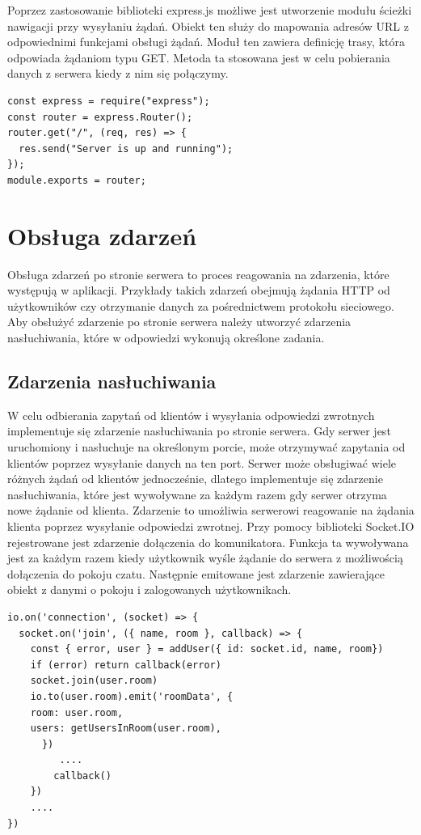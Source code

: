 Poprzez zastosowanie biblioteki express.js możliwe jest utworzenie modułu ścieżki nawigacji przy wysyłaniu żądań. Obiekt ten służy do mapowania adresów URL z odpowiednimi funkcjami obsługi żądań. Moduł ten zawiera definicję trasy, która odpowiada żądaniom typu GET. Metoda ta stosowana jest w celu pobierania danych z serwera kiedy z nim się połączymy.
\begin{lstlisting}[caption=Implementacja sciezki serwera]
const express = require("express");
const router = express.Router();
router.get("/", (req, res) => {
  res.send("Server is up and running");
});
module.exports = router;
\end{lstlisting}
\section{Obsługa zdarzeń}
Obsługa zdarzeń po stronie serwera to proces reagowania na zdarzenia, które występują w aplikacji. Przykłady takich zdarzeń obejmują żądania HTTP od użytkowników czy otrzymanie danych za pośrednictwem protokołu sieciowego. Aby obsłużyć zdarzenie po stronie serwera należy utworzyć zdarzenia nasłuchiwania, które w odpowiedzi wykonują określone zadania.
\subsection{Zdarzenia nasłuchiwania}
W celu odbierania zapytań od klientów i wysyłania odpowiedzi zwrotnych implementuje się zdarzenie nasłuchiwania po stronie serwera. Gdy serwer jest uruchomiony i nasłuchuje na określonym porcie, może otrzymywać zapytania od klientów poprzez wysyłanie danych na ten port. Serwer może obsługiwać wiele różnych żądań od klientów jednocześnie, dlatego implementuje się zdarzenie nasłuchiwania, które jest wywoływane za każdym razem gdy serwer otrzyma nowe żądanie od klienta. Zdarzenie to umożliwia serwerowi reagowanie na żądania klienta poprzez wysyłanie odpowiedzi zwrotnej. 
Przy pomocy biblioteki Socket.IO rejestrowane jest zdarzenie dołączenia do komunikatora. Funkcja ta wywoływana jest za każdym razem kiedy użytkownik wyśle żądanie do serwera z możliwością dołączenia do pokoju czatu. Następnie emitowane jest zdarzenie zawierające obiekt z danymi o pokoju i zalogowanych użytkownikach.
\begin{lstlisting}[caption=Implementacja zdarzenia dolaczenia i pobierania danych]
io.on('connection', (socket) => {
  socket.on('join', ({ name, room }, callback) => {
    const { error, user } = addUser({ id: socket.id, name, room})
    if (error) return callback(error)
    socket.join(user.room)
    io.to(user.room).emit('roomData', {
    room: user.room,
    users: getUsersInRoom(user.room),
      })
         ....		
        callback()
    })
	....
})
\end{lstlisting}

